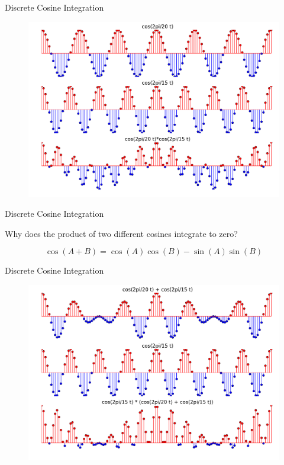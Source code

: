 \documentclass{beamer}
\begin{document}
\begin{frame}{Discrete Cosine Integration}

\begin{figure}[t]
    \includegraphics[width=\textwidth]{cosProd1.pdf}
\end{figure}

\end{frame}

\begin{frame}{Discrete Cosine Integration}

Why does the product of two different cosines integrate to zero?

\[ \cos(A+B) = \cos(A)\cos(B) - \sin(A)\sin(B) \]


\end{frame}

\begin{frame}{Discrete Cosine Integration}

\begin{figure}[t]
    \includegraphics[width=\textwidth]{cosProd2.pdf}
\end{figure}

\end{frame}
\end{document}

